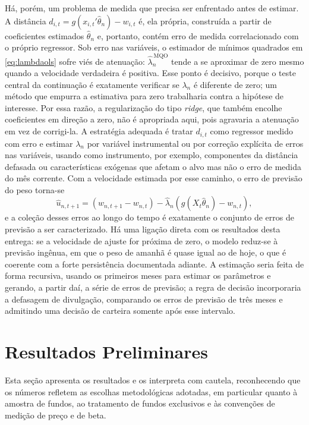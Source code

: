 \documentclass[12pt,a4paper]{article}
\begin{document}
Há, porém, um problema de medida que precisa ser enfrentado antes de estimar. A distância
$d_{i,t}=g(x_{i,t}'\widehat{\theta}_n)-w_{i,t}$ é, ela própria, construída a partir de
coeficientes estimados $\widehat{\theta}_n$ e, portanto, contém erro de medida correlacionado com
o próprio regressor. Sob erro nas variáveis, o estimador de mínimos quadrados em
\eqref{eq:lambdaols} sofre viés de atenuação: $\widehat{\lambda}^{\,\text{MQO}}_n$ tende a se
aproximar de zero mesmo quando a velocidade verdadeira é positiva. Esse ponto é decisivo, porque
o teste central da continuação é exatamente verificar se $\lambda_n$ é diferente de zero; um
método que empurra a estimativa para zero trabalharia contra a hipótese de interesse. Por essa
razão, a regularização do tipo \emph{ridge}, que também encolhe coeficientes em direção a zero,
não é apropriada aqui, pois agravaria a atenuação em vez de corrigi-la. A estratégia adequada é
tratar $d_{i,t}$ como regressor medido com erro e estimar $\lambda_n$ por variável instrumental
ou por correção explícita de erros nas variáveis, usando como instrumento, por exemplo,
componentes da distância defasada ou características exógenas que afetam o alvo mas não o erro de
medida do mês corrente. Com a velocidade estimada por esse caminho, o erro de previsão do peso
torna-se
\begin{equation}
\widehat{u}_{n,t+1} = (w_{n,t+1}-w_{n,t}) - \widehat{\lambda}_n\!\left(g(X_t\widehat{\theta}_n)-w_{n,t}\right),
\label{eq:u}
\end{equation}
e a coleção desses erros ao longo do tempo é exatamente o conjunto de erros de previsão a ser
caracterizado. Há uma ligação direta com os resultados desta entrega: se a velocidade de ajuste
for próxima de zero, o modelo reduz-se à previsão ingênua, em que o peso de amanhã é quase igual
ao de hoje, o que é coerente com a forte persistência documentada adiante. A estimação seria
feita de forma recursiva, usando os primeiros meses para estimar os parâmetros e gerando, a
partir daí, a série de erros de previsão; a regra de decisão incorporaria a defasagem de
divulgação, comparando os erros de previsão de três meses e admitindo uma decisão de carteira
somente após esse intervalo.

\section{Resultados Preliminares}

Esta seção apresenta os resultados e os interpreta com cautela, reconhecendo que os números
refletem as escolhas metodológicas adotadas, em particular quanto à amostra de fundos, ao
tratamento de fundos exclusivos e às convenções de medição de preço e de beta.
\end{document}
